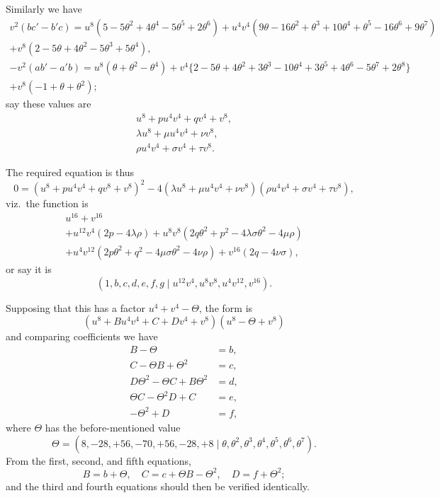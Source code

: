 \documentclass[11pt,a4paper]{book}
\begin{document}
Similarly we have
\begin{multline*}
v^2(bc' - b'c) = u^8(5 - 5\theta^2 + 4\theta^4 - 5\theta^5 + 2\theta^6) + u^4 v^4(9\theta - 16\theta^2 + \theta^3 + 10\theta^4 + \theta^5 - 16\theta^6 + 9\theta^7)\\
+ v^8(2 - 5\theta + 4\theta^2 - 5\theta^3 + 5\theta^4),
\end{multline*}
\begin{multline*}
-v^2(ab' - a'b) = u^8(\theta + \theta^2 - \theta^4) + v^4\{2 - 5\theta + 4\theta^2 + 3\theta^3 - 10\theta^4 + 3\theta^5 + 4\theta^6 - 5\theta^7 + 2\theta^8\}\\
+ v^8(-1 + \theta + \theta^2);
\end{multline*}
say these values are
\begin{gather*}
u^8 + pu^4 v^4 + qv^4 + v^8,\\
\lambda u^8 + \mu u^4 v^4 + \nu v^8,\\
\rho u^4 v^4 + \sigma v^4 + \tau v^8.
\end{gather*}

The required equation is thus
\[
0 = (u^8 + pu^4 v^4 + qv^8 + v^8)^2 - 4(\lambda u^8 + \mu u^4 v^4 + \nu v^8)(\rho u^4 v^4 + \sigma v^4 + \tau v^8),
\]
viz.\ the function is
\begin{multline*}
u^{16} + v^{16}\\
+ u^{12}v^4(2p - 4\lambda\rho)
+ u^8 v^8(2q\theta^2 + p^2 - 4\lambda\sigma\theta^2 - 4\mu\rho)\\
+ u^4 v^{12}(2p\theta^2 + q^2 - 4\mu\sigma\theta^2 - 4\nu\rho)
+ v^{16}(2q - 4\nu\sigma),
\end{multline*}
or say it is
\[
(1, b, c, d, e, f, g \mid u^{12}v^4, u^8 v^8, u^4 v^{12}, v^{16}).
\]

\newpage
Supposing that this has a factor $u^4 + v^4 - \Theta$, the form is
\[
(u^8 + Bu^4 v^4 + C + Dv^4 + v^8)(u^8 - \Theta + v^8)
\]
and comparing coefficients we have
\begin{align*}
B - \Theta &= b,\\
C - \Theta B + \Theta^2 &= c,\\
D\Theta^2 - \Theta C + B\Theta^2 &= d,\\
\Theta C - \Theta^2 D + C &= e,\\
-\Theta^2 + D &= f,
\end{align*}
where $\Theta$ has the before-mentioned value
\[
\Theta = (8, -28, +56, -70, +56, -28, +8 \mid \theta, \theta^2, \theta^3, \theta^4, \theta^5, \theta^6, \theta^7).
\]
From the first, second, and fifth equations,
\[
B = b + \Theta,\quad C = c + \Theta B - \Theta^2,\quad D = f + \Theta^2;
\]
and the third and fourth equations should then be verified identically.
\end{document}
